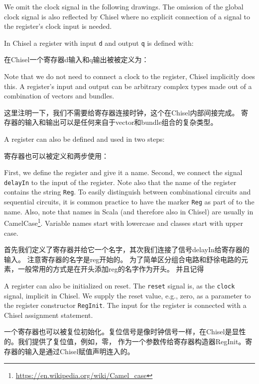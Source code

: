 \documentclass[%
    10pt,
    headinclude, footexclude,
    openright, %
    notitlepage,
    cleardoubleempty,
    headsepline,
    pointlessnumbers,
    bibtotoc, idxtotoc,
    ]{scrbook}
\newcommand{\code}[1]{{\small{\texttt{#1}}}}
\newcommand{\myref}[2]{\href{#1}{#2}}
\renewcommand{\myref}[2]{{#2}{\footnote{\url{#1}}}}
\begin{document}
We omit the clock signal in the following
drawings. The omission of the global clock signal is also reflected by Chisel where no explicit
connection of a signal to the register's clock input is needed.




In Chisel a register with input \code{d} and output \code{q} is defined with:

在Chisel一个寄存器d输入和q输出被被定义为：


\noindent Note that we do not need to connect a clock to the register, Chisel implicitly does this.
A register's input and output can be arbitrary complex types
made out of a combination of vectors and bundles.

这里注明一下，我们不需要给寄存器连接时钟，这个在Chisel内部间接完成。 
寄存器的输入和输出可以是任何来自于vector和bundle组合的复杂类型。


A register can also be defined and used in two steps:

寄存器也可以被定义和两步使用：


First, we define the register and give it a name. Second, we connect the signal
\code{delayIn} to the input of the register. Note also that the name of the register
contains the string \code{Reg}. To easily distinguish between combinational
circuits and sequential circuits, it is common practice to have the marker
\code{Reg} as part of to the name. Also, note that names in Scala (and therefore
also in Chisel) are usually in
\myref{https://en.wikipedia.org/wiki/Camel_case}{CamelCase}.
Variable names start with lowercase and classes start with upper case.

首先我们定义了寄存器并给它一个名字，其次我们连接了信号delayIn给寄存器的输入。
注意寄存器的名字是reg开始的。
为了简单区分组合电路和舒徐电路的元素，一般常用的方式是在开头添加reg的名字作为开头。
并且记得


A register can also be initialized on reset. The \code{reset} signal is, as the \code{clock} signal,
implicit in Chisel. We supply the reset value, e.g., zero, as a parameter to the register
constructor \code{RegInit}. The input for the register is connected with a Chisel
assignment statement.

一个寄存器也可以被复位初始化。复位信号是像时钟信号一样，在Chisel是显性的。我们提供了复位值，例如，零，
作为一个参数传给寄存器构造器RegInit。寄存器的输入是通过Chisel赋值声明连入的。
\end{document}
